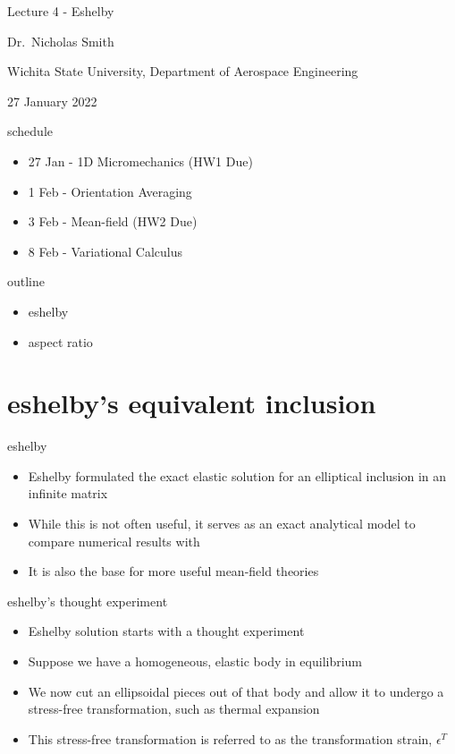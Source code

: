 \documentclass[
  letterpaper,
  ignorenonframetext,
  aspectratio=43,
  handout,
  12pt]{beamer}
\author{}
\date{}
\providecommand{\tightlist}{%
  \setlength{\itemsep}{0pt}\setlength{\parskip}{0pt}}
\providecommand{\tightlist}{%
\setlength{\itemsep}{0pt}\setlength{\parskip}{0pt}}
\begin{document}
\begin{frame}
Lecture 4 - Eshelby

Dr.~Nicholas Smith

Wichita State University, Department of Aerospace Engineering

27 January 2022
\end{frame}

\begin{frame}{schedule}
\protect\hypertarget{schedule}{}
\begin{itemize}
\tightlist
\item
  27 Jan - 1D Micromechanics (HW1 Due)
\item
  1 Feb - Orientation Averaging
\item
  3 Feb - Mean-field (HW2 Due)
\item
  8 Feb - Variational Calculus
\end{itemize}
\end{frame}

\begin{frame}{outline}
\protect\hypertarget{outline}{}
\begin{itemize}
\tightlist
\item
  eshelby
\item
  aspect ratio
\end{itemize}
\end{frame}

\hypertarget{eshelbys-equivalent-inclusion}{%
\section{eshelby's equivalent
inclusion}\label{eshelbys-equivalent-inclusion}}

\begin{frame}{eshelby}
\protect\hypertarget{eshelby}{}
\begin{itemize}
\tightlist
\item
  Eshelby formulated the exact elastic solution for an elliptical
  inclusion in an infinite matrix
\item
  While this is not often useful, it serves as an exact analytical model
  to compare numerical results with
\item
  It is also the base for more useful mean-field theories
\end{itemize}
\end{frame}

\begin{frame}{eshelby's thought experiment}
\protect\hypertarget{eshelbys-thought-experiment}{}
\begin{itemize}
\tightlist
\item
  Eshelby solution starts with a thought experiment
\item
  Suppose we have a homogeneous, elastic body in equilibrium
\item
  We now cut an ellipsoidal pieces out of that body and allow it to
  undergo a stress-free transformation, such as thermal expansion
\item
  This stress-free transformation is referred to as the transformation
  strain, \(\epsilon^T\)
\end{itemize}
\end{frame}
\end{document}
